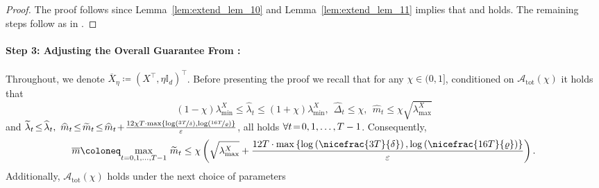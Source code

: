 \documentclass[11pt]{article}
\theoremstyle{definition}
\theoremstyle{plain}
\providecommand{\lemmaref}[1]{Lemma~\ref{#1}}
\newcommand{\eps}{{\varepsilon}}
\providecommand{\brI}{\mathbb{I}}
\renewcommand{\eps}{\varepsilon}
\begin{document}
\begin{proof}
    The proof follows since \lemmaref{lem:extend_lem_10} and \lemmaref{lem:extend_lem_11} implies that \citet[Lemma.~11]{lev2026near} and \citet[Lemma.~10]{lev2026near} holds. The remaining steps follow as in \citet{lev2026near}.    
\end{proof}
\paragraph{Step 3: Adjusting the Overall Guarantee From \citet{lev2026near}:}\mbox{}

Throughout, we denote $\overline{X}_{\eta} \coloneq \left(X^{\top}, \eta \brI_d\right)^{\top}$. Before presenting the proof we recall that for any $\chi \in (0, 1]$, conditioned on $\mathcal{A}_{\mathrm{tot}}(\chi)$ it holds that 
\begin{equation}
    \label{eq:guarantee_eigenvalue}
    \left(1 - \chi\right)\lambda^{X}_{\min} \leq \widehat{\lambda}_t \leq \left(1+\chi\right)\lambda^{X}_{\min}, \ \ \widehat{\Delta}_t \leq \chi, \ \ \widehat{m}_t \leq \chi\sqrt{\lambda^{X}_{\max}} 
\end{equation}
and $\widetilde{\lambda}_t \hspace{-0.15em}\leq\hspace{-0.15em} \widehat{\lambda}_t, \ \widehat{m}_t \hspace{-0.15em}\leq\hspace{-0.15em} \widetilde{m}_t \hspace{-0.15em}\leq\hspace{-0.15em} \widehat{m}_t \hspace{-0.15em}+\hspace{-0.15em} \frac{12\chi T\cdot\max\left\{\log\left(\nicefrac{3T}{\delta}\right), \log\left(\nicefrac{16T}{\varrho}\right)\right\}}{\eps}$, all holds $\forall t\hspace{-0.15em}=\hspace{-0.15em}0,1,\ldots, T-1$. Consequently,
\begin{equation}
    \overline{m} \coloneq \underset{t=0,1,\ldots, T-1}{\max} \ {\widetilde{m}_t}\leq \chi\left(\sqrt{\lambda^{X}_{\max}} + \frac{12T\cdot \max\left\{\log\left(\nicefrac{3T}{\delta}\right), \log\left(\nicefrac{16T}{\varrho}\right)\right\}}{\eps}\right).     
\end{equation}
Additionally, $\mathcal{A}_{\mathrm{tot}}(\chi)$ holds under the next choice of parameters 
\end{document}
